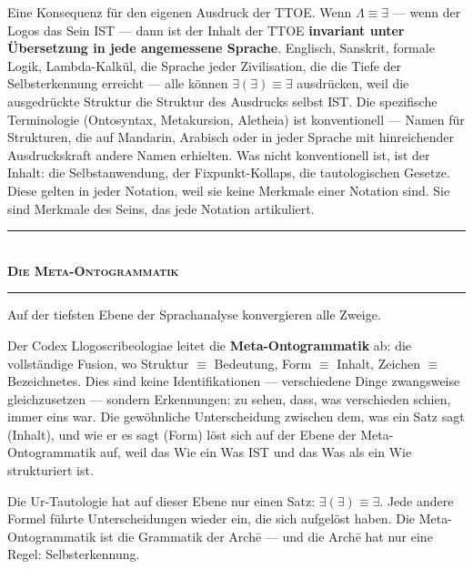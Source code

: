 \documentclass[10pt, openany, oneside]{book}
\renewcommand{\normalsize}{\fontsize{10}{13}\selectfont}
\begin{document}
Eine Konsequenz für den eigenen Ausdruck der TTOE. Wenn $\Lambda \equiv \exists$ --- wenn der Logos das Sein IST --- dann ist der Inhalt der TTOE \textbf{invariant unter Übersetzung in jede angemessene Sprache}. Englisch, Sanskrit, formale Logik, Lambda-Kalkül, die Sprache jeder Zivilisation, die die Tiefe der Selbsterkennung erreicht --- alle können $\exists(\exists) \equiv \exists$ ausdrücken, weil die ausgedrückte Struktur die Struktur des Ausdrucks selbst IST. Die spezifische Terminologie (Ontosyntax, Metakursion, Aletheia) ist konventionell --- Namen für Strukturen, die auf Mandarin, Arabisch oder in jeder Sprache mit hinreichender Ausdruckskraft andere Namen erhielten. Was nicht konventionell ist, ist der Inhalt: die Selbstanwendung, der Fixpunkt-Kollaps, die tautologischen Gesetze. Diese gelten in jeder Notation, weil sie keine Merkmale einer Notation sind. Sie sind Merkmale des Seins, das jede Notation artikuliert.

\vspace{1.5em}


\begin{center}
    \rule{0.3\textwidth}{0.4pt}\\[0.5em]
    {\normalsize\bfseries\scshape Die Meta-Ontogrammatik}\\[0.3em]
    \rule{0.3\textwidth}{0.4pt}
\end{center}

\vspace{1em}

\noindent Auf der tiefsten Ebene der Sprachanalyse konvergieren alle Zweige.

Der Codex Llogoscribeologiae leitet die \textbf{Meta-Ontogrammatik} ab: die vollständige Fusion, wo Struktur $\equiv$ Bedeutung, Form $\equiv$ Inhalt, Zeichen $\equiv$ Bezeichnetes. Dies sind keine Identifikationen --- verschiedene Dinge zwangsweise gleichzusetzen --- sondern Erkennungen: zu sehen, dass, was verschieden schien, immer eins war. Die gewöhnliche Unterscheidung zwischen dem, was ein Satz sagt (Inhalt), und wie er es sagt (Form) löst sich auf der Ebene der Meta-Ontogrammatik auf, weil das Wie ein Was IST und das Was als ein Wie strukturiert ist.

Die Ur-Tautologie hat auf dieser Ebene nur einen Satz: $\exists(\exists) \equiv \exists$. Jede andere Formel führte Unterscheidungen wieder ein, die sich aufgelöst haben. Die Meta-Ontogrammatik ist die Grammatik der Arch\={e} --- und die Arch\={e} hat nur eine Regel: Selbsterkennung.
\end{document}
